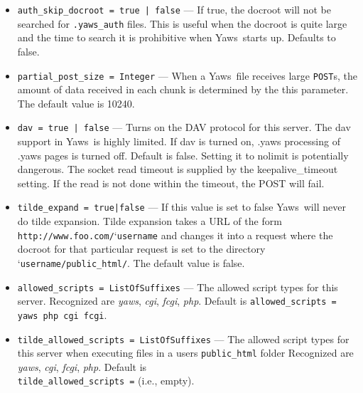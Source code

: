 \documentclass[11pt,oneside,english]{book}
\newcommand{\Yaws}            %
        {{\sc Yaws}}
\begin{document}
\begin{itemize}
\item       \verb+auth_skip_docroot = true | false+ ---
              If true, the docroot will not be searched for
              \verb+.yaws_auth+ files. This is useful when the
              docroot is quite large and the time to search it is
              prohibitive when \Yaws\  starts up. Defaults to false.

\item       \verb+partial_post_size = Integer+ ---
              When a \Yaws\  file receives large  \verb+POST+s,  the
              amount  of  data  received  in each chunk is
              determined by the this parameter.  The default
              value is 10240.

\item       \verb+dav = true | false+ ---
              Turns on the DAV protocol for this server. The dav support in
              \Yaws\ is highly limited. If dav is turned on, .yaws processing of
              .yaws pages is turned off. Default is false. Setting it to nolimit
              is potentially dangerous. The socket read timeout is supplied by
              the keepalive\_timeout setting. If the read is not done within the
              timeout, the POST will fail.

\item       \verb+tilde_expand = true|false+ ---
              If  this  value  is  set  to false \Yaws\  will
              never do tilde  expansion.  Tilde expansion takes a URL
              of the form
              \verb+http://www.foo.com/+\char`\~\verb+username+ and
              changes it into a request where the docroot for that
              particular request is set to the directory
              \char`\~\verb+username/public_html/+. The default value
              is false.

\item       \verb+allowed_scripts = ListOfSuffixes+ ---
              The allowed script types for this server.  Recognized are
              \textit{yaws}, \textit{cgi}, \textit{fcgi}, \textit{php}.  Default
              is \verb+allowed_scripts = yaws php cgi fcgi+.

\item       \verb+tilde_allowed_scripts = ListOfSuffixes+ ---
             The allowed script types for this server when executing files in a
             users \verb+public_html+ folder Recognized are \textit{yaws},
             \textit{cgi}, \textit{fcgi}, \textit{php}. Default is\\
             \verb+tilde_allowed_scripts =+ (i.e., empty).


\end{itemize}
\end{document}
